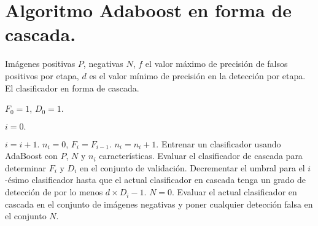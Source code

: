 \appendix{}

\chapter{Algoritmo Adaboost en forma de cascada.} \label{capit:apendB}
%
\setcounter{figure}{0}


\begin{algorithm}[h!]
\begin{algorithmic}[2]

\REQUIRE Imágenes positivas $P$, negativas $N$, $f$ el valor máximo de precisión de falsos positivos por etapa, $d$ es el valor mínimo de precisión en la detección por etapa. 
\ENSURE El clasificador en forma de cascada.  

\STATE  $F_0 = 1$, $D_0=1.$

\STATE  $i=0.$ 

	\STATE $i=i+1.$
	\STATE $n_i=0$, $F_i=F_{i-1}.$
		\STATE $n_i = n_i +1.$ 
		\STATE Entrenar un clasificador usando AdaBoost con $P$, $N$ y $n_i$ características. 
		\STATE Evaluar el clasificador de cascada para determinar $F_i$ y $D_i$ en el conjunto de validación. 
		\STATE Decrementar el umbral para el $i$-ésimo clasificador hasta que el actual clasificador en cascada tenga un grado 			de detección de por lo menos $d \times D_i-1$.
	\ENDWHILE
	\STATE $N=0.$ 
		\STATE Evaluar el actual clasificador en cascada en el conjunto de imágenes negativas y poner cualquier detección 				falsa en el conjunto $N$.
	\ENDIF

\ENDWHILE    
\caption{}\label{alg:Cascade} 
\end{algorithmic}
\end{algorithm} 